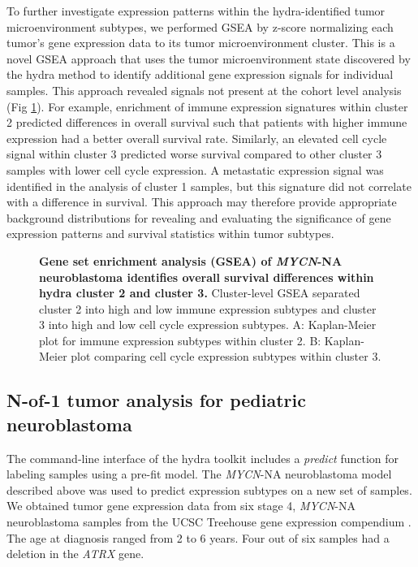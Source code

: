 \documentclass[10pt,letterpaper]{article}
\begin{document}
To further investigate expression patterns within the hydra-identified tumor microenvironment subtypes, we performed GSEA by z-score normalizing each tumor’s gene expression data to its tumor microenvironment cluster. This is a novel GSEA approach that uses the tumor microenvironment state discovered by the hydra method to identify additional gene expression signals for individual samples. This approach revealed signals not present at the cohort level analysis (Fig \ref{subcluster}). For example, enrichment of immune expression signatures within cluster 2 predicted differences in overall survival such that patients with higher immune expression had a better overall survival rate. Similarly, an elevated cell cycle signal within cluster 3 predicted worse survival compared to other cluster 3 samples with lower cell cycle expression. A metastatic expression signal was identified in the analysis of cluster 1 samples, but this signature did not correlate with a difference in survival. This approach may therefore provide appropriate background distributions for revealing and evaluating the significance of gene expression patterns and survival statistics within tumor subtypes.


\begin{figure}[!h]
	\caption{{\bf Gene set enrichment analysis (GSEA) of \textit{MYCN}-NA neuroblastoma identifies overall survival differences within hydra cluster 2 and cluster 3.}
		Cluster-level GSEA separated cluster 2 into high and low immune expression subtypes and cluster 3 into high and low cell cycle expression subtypes. A: Kaplan-Meier plot for immune expression subtypes within cluster 2. B: Kaplan-Meier plot comparing cell cycle expression subtypes within cluster 3.}
	\label{subcluster}
\end{figure}

\subsection*{N-of-1 tumor analysis for pediatric neuroblastoma}
The command-line interface of the hydra toolkit includes a \textit{predict} function for labeling samples using a pre-fit model. The \textit{MYCN}-NA neuroblastoma model described above was used to predict expression subtypes on a new set of samples. We obtained tumor gene expression data from six stage 4, \textit{MYCN}-NA neuroblastoma samples from the UCSC Treehouse gene expression compendium \cite{newtonTumorMapExploringMolecular2017, vaskeComparativeTumorRNA2019}. The age at diagnosis ranged from 2 to 6 years. Four out of six samples had a deletion in the \textit{ATRX} gene. 
\end{document}
